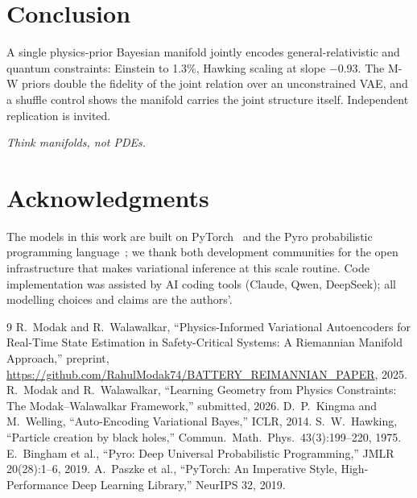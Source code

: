 \documentclass[10pt,twocolumn]{article}
\begin{document}
\section{Conclusion}
A single physics-prior Bayesian manifold jointly encodes general-relativistic and quantum
constraints: Einstein to 1.3\%, Hawking scaling at slope $-0.93$. The M-W priors double the
fidelity of the joint relation over an unconstrained VAE, and a shuffle control shows the
manifold carries the joint structure itself. Independent replication is invited.

\smallskip\noindent\textit{Think manifolds, not PDEs.}

\section*{Acknowledgments}
The models in this work are built on PyTorch~\cite{pytorch} and the Pyro probabilistic
programming language~\cite{pyro}; we thank both development communities for the open
infrastructure that makes variational inference at this scale routine.
Code implementation was assisted by AI coding tools (Claude, Qwen, DeepSeek); all modelling
choices and claims are the authors'.

\begin{thebibliography}{9}\small
{} R.~Modak and R.~Walawalkar, ``Physics-Informed Variational Autoencoders for
Real-Time State Estimation in Safety-Critical Systems: A Riemannian Manifold Approach,''
preprint, \url{https://github.com/RahulModak74/BATTERY_REIMANNIAN_PAPER}, 2025.
 R.~Modak and R.~Walawalkar, ``Learning Geometry from Physics Constraints: The
Modak--Walawalkar Framework,'' submitted, 2026.
 D.~P.~Kingma and M.~Welling, ``Auto-Encoding Variational Bayes,'' ICLR, 2014.
 S.~W.~Hawking, ``Particle creation by black holes,'' Commun.\ Math.\ Phys.\
43(3):199--220, 1975.
 E.~Bingham et al., ``Pyro: Deep Universal Probabilistic Programming,'' JMLR
20(28):1--6, 2019.
 A.~Paszke et al., ``PyTorch: An Imperative Style, High-Performance Deep
Learning Library,'' NeurIPS 32, 2019.
\end{thebibliography}
\end{document}
